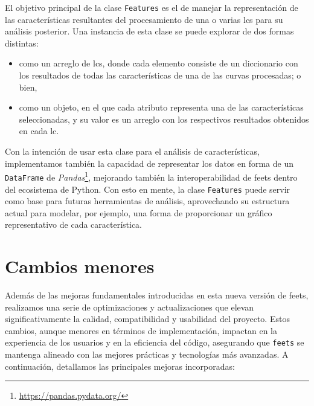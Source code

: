 \begin{description}
    El objetivo principal de la clase \texttt{Features} es el de manejar la representación de las características resultantes del procesamiento de una o varias \glspl{lc} para su análisis posterior. Una instancia de esta clase se puede explorar de dos formas distintas:
    \begin{itemize}
        \item como un arreglo de \glspl{lc}, donde cada elemento consiste de un diccionario con los resultados de todas las características de una de las curvas procesadas; o bien,
        \item como un objeto, en el que cada atributo representa una de las características seleccionadas, y su valor es un arreglo con los respectivos resultados obtenidos en cada \gls{lc}.
    \end{itemize}

    Con la intención de usar esta clase para el análisis de características, implementamos también la capacidad de representar los datos en forma de un \texttt{DataFrame} de \emph{Pandas}\footnote{\url{https://pandas.pydata.org/}}, mejorando también la interoperabilidad de \gls{feets} dentro del ecosistema de Python. Con esto en mente, la clase \texttt{Features} puede servir como base para futuras herramientas de análisis, aprovechando su estructura actual para modelar, por ejemplo, una forma de proporcionar un gráfico representativo de cada característica.
\end{description}

    \section{Cambios menores}

Además de las mejoras fundamentales introducidas en esta nueva versión de \gls{feets}, realizamos una serie de optimizaciones y actualizaciones que elevan significativamente la calidad, compatibilidad y usabilidad del proyecto. Estos cambios, aunque menores en términos de implementación, impactan en la experiencia de los usuarios y en la eficiencia del código, asegurando que \texttt{feets} se mantenga alineado con las mejores prácticas y tecnologías más avanzadas. A continuación, detallamos las principales mejoras incorporadas:

